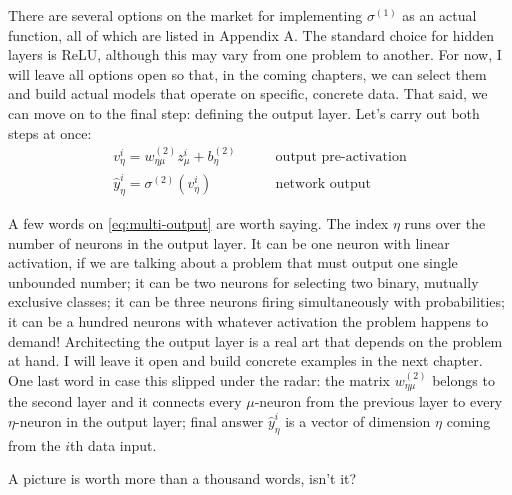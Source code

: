 \documentclass[11pt,a4paper,oneside]{book}
\theoremstyle{definition}
\theoremstyle{plain}
\theoremstyle{remark}
\begin{document}
There are several options on the market for implementing $\sigma^{(1)}$ as an actual function, all of which are listed in Appendix A. The standard choice for hidden layers is ReLU, although this may vary from one problem to another. For now, I will leave all options open so that, in the coming chapters, we can select them and build actual models that operate on specific, concrete data. That said, we can move on to the final step: defining the output layer. Let's carry out both steps at once:
\begin{equation}
    \label{eq:multi-output}
    \begin{split}
        v^i_\eta = w^{(2)}_{\eta\mu} z^i_\mu + b^{(2)}_\eta &\qquad\text{output pre-activation}\\
        \hat y^i_\eta = \sigma^{(2)}(v^i_\eta) &\qquad\text{network output}
    \end{split}
\end{equation}

A few words on \eqref{eq:multi-output} are worth saying. The index $\eta$ runs over the number of neurons in the output layer. It can be one neuron with linear activation, if we are talking about a problem that must output one single unbounded number; it can be two neurons for selecting two binary, mutually exclusive classes; it can be three neurons firing simultaneously with probabilities; it can be a hundred neurons with whatever activation the problem happens to demand! Architecting the output layer is a real art that depends on the problem at hand. I will leave it open and build concrete examples in the next chapter. One last word in case this slipped under the radar: the matrix $w^{(2)}_{\eta\mu}$ belongs to the second layer and it connects every $\mu$-neuron from the previous layer to every $\eta$-neuron in the output layer; final answer $\hat y^i_\eta$ is a vector of dimension $\eta$ coming from the $i$th data input.

A picture is worth more than a thousand words, isn't it?
\end{document}
